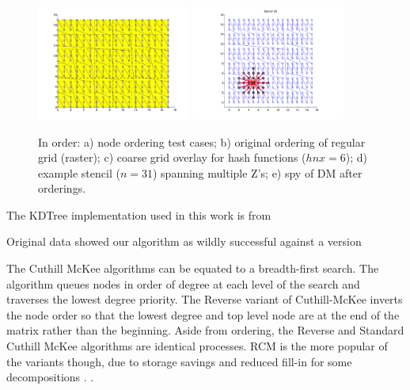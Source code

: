 \documentclass{report}
\begin{document}
\begin{figure}
\centering
\includegraphics[width=0.45\textwidth]{rbffd_methods_content/hashing/overlay_regulargrid-eps-converted-to.pdf} \includegraphics[width=0.45\textwidth]{rbffd_methods_content/hashing/stencil_regulargrid-eps-converted-to.pdf}
\caption{In order: a) node ordering test cases; b) original ordering of regular grid (raster); c) coarse grid overlay for hash functions ($hnx = 6$); d) example stencil ($n=31$) spanning multiple Z's; e) spy of DM after orderings. }
\label{fig:orderings}
\end{figure}

The KDTree implementation used in this work is from 

Original data showed our algorithm as wildly successful against a version  

The Cuthill McKee algorithms can be equated to a breadth-first search. The algorithm queues nodes in order of degree at each level of the search and traverses the lowest degree priority. The Reverse variant of Cuthill-McKee inverts the node order so that the lowest degree and top level node are at the end of the matrix rather than the beginning. Aside from ordering, the Reverse and Standard Cuthill McKee algorithms are identical processes. RCM is the more popular of the variants though, due to storage savings and reduced fill-in for some decompositions \cite{LiuSherman1976}.	. 

\end{document}
